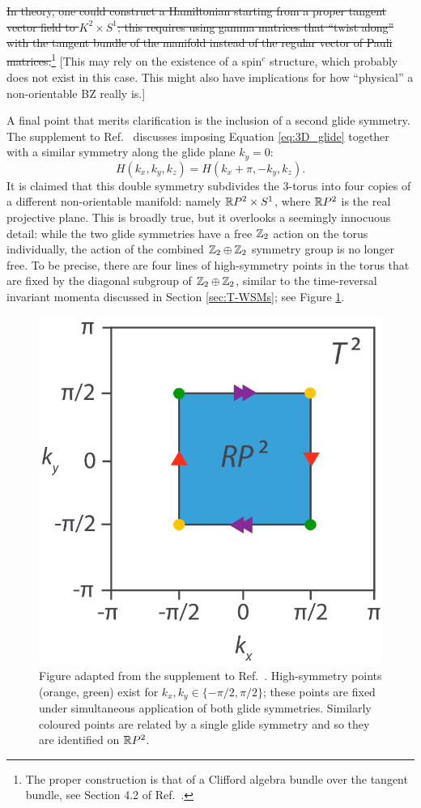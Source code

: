 {\color{red}
\st{In theory, one could construct a Hamiltonian starting from a proper tangent vector field to $K^2\times S^1$; this requires using gamma matrices that ``twist along'' with the tangent bundle of the manifold instead of the regular vector of Pauli matrices.}\footnote{\color{red}
	The proper construction is that of a Clifford algebra bundle over the tangent bundle, see Section 4.2 of Ref.\ \cite{Mathai_math-review}.}
[This may rely on the existence of a spin$^c$ structure, which probably does not exist in this case. This might also have implications for how ``physical'' a non-orientable BZ really is.]
}

A final point that merits clarification is the inclusion of a second glide symmetry. The supplement to Ref.\ \cite{Fonseca-Vaidya_nonorientable} discusses imposing Equation \eqref{eq:3D_glide} together with a similar symmetry along the glide plane $k_y = 0$:
\begin{equation}
	H(k_x, k_y, k_z) = H(k_x + \pi, -k_y, k_z).
\end{equation}
It is claimed that this double symmetry subdivides the 3-torus into four copies of a different non-orientable manifold: namely $\mathbb{R} P^2\times S^1$, where $\mathbb{R} P^2$ is the real projective plane. This is broadly true, but it overlooks a seemingly innocuous detail: while the two glide symmetries have a free $\mathbb{Z}_2$ action on the torus individually, the action of the combined $\mathbb{Z}_2\oplus\mathbb{Z}_2$ symmetry group is no longer free. To be precise, there are four lines of high-symmetry points in the torus that are fixed by the diagonal subgroup of $\mathbb{Z}_2\oplus\mathbb{Z}_2$, similar to the time-reversal invariant momenta discussed in Section \ref{sec:T-WSMs}; see Figure \ref{fig:RP2-corners}.
\begin{figure}[htb!]
	\centering
	\includegraphics[width=.5\linewidth]{Images/RP2-corners}
	\caption{Figure adapted from the supplement to Ref.\ \cite{Fonseca-Vaidya_nonorientable}. High-symmetry points (orange, green) exist for $k_x,k_y\in\{-\pi/2,\pi/2\}$; these points are fixed under simultaneous application of both glide symmetries. Similarly coloured points are related by a single glide symmetry and so they are identified on $\mathbb{R} P^2$.}
	\label{fig:RP2-corners}
\end{figure}
